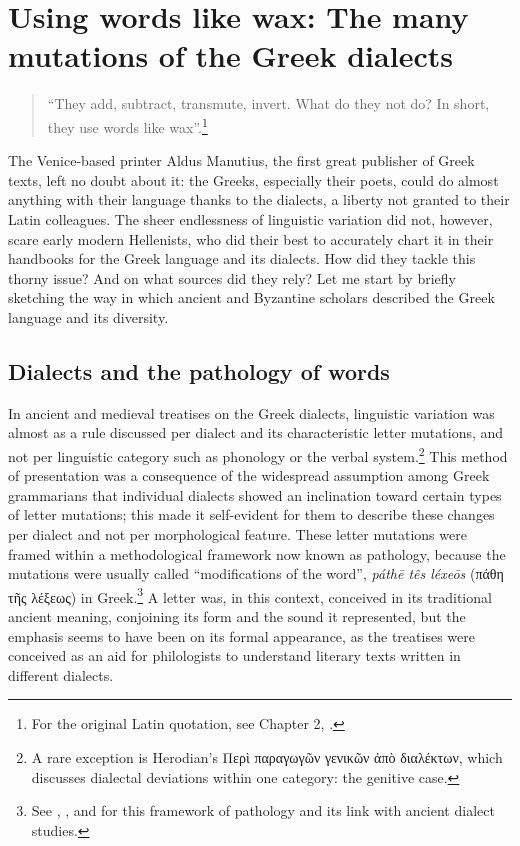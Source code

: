 \chapter{Using words like wax: The many mutations of the Greek dialects}\label{chap:6}

\begin{quote}
“They add, subtract, transmute, invert. What do they not do? In short, they use words like wax”.\footnote{{For the original Latin quotation, see Chapter 2, .}} 
\end{quote}

The Venice-based printer Aldus Manutius, the first great publisher of Greek texts, left no doubt about it: the Greeks, especially their poets, could do almost anything with their language thanks to the dialects, a liberty not granted to their Latin colleagues. The sheer endlessness of linguistic variation did not, however, scare early modern Hellenists, who did their best to accurately chart it in their handbooks for the Greek language and its dialects. How did they tackle this thorny issue? And on what sources did they rely? Let me start by briefly sketching the way in which ancient and Byzantine scholars described the Greek language and its diversity.

\section{Dialects and the pathology of words}\label{sec:6.1}

In ancient and medieval treatises on the Greek dialects, linguistic variation was almost as a rule discussed per dialect and its characteristic letter mutations, and not per linguistic category such as phonology or the verbal system.\footnote{{A rare exception is Herodian’s Περὶ παραγωγῶν γενικῶν ἀπὸ διαλέκτων, which discusses dialectal deviations within one category: the genitive case.}} This method of presentation was a consequence of the widespread assumption among Greek grammarians that individual dialects showed an inclination toward certain types of letter mutations; this made it self-evident for them to describe these changes per dialect and not per morphological feature. These letter mutations were framed within a methodological framework now known as pathology, because the mutations were usually called “modifications of the word”, \textit{páthē tês léxeōs} (πάθη τῆς λέξεως) in Greek.\footnote{{See \citet{Wackernagel1876}, \citet[150]{Siebenborn1976}, and \citet[esp. 118]{Lallot1995} for this framework of pathology and its link with ancient dialect studies.}} A letter was, in this context, conceived in its traditional ancient meaning, conjoining its form and the sound it represented, but the emphasis seems to have been on its formal appearance, as the treatises were conceived as an aid for philologists to understand literary texts written in different dialects. 


